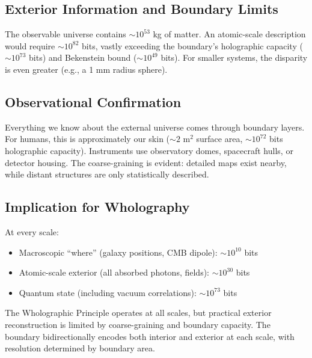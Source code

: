 ﻿\documentclass[12pt]{article}
\begin{document}
\subsection*{Exterior Information and Boundary Limits}
The observable universe contains $\sim 10^{53}$ kg of matter. An atomic-scale description would require $\sim 10^{82}$ bits, vastly exceeding the boundary's holographic capacity ($\sim 10^{73}$ bits) and Bekenstein bound ($\sim 10^{49}$ bits). For smaller systems, the disparity is even greater (e.g., a 1 mm radius sphere).


\subsection*{Observational Confirmation}
Everything we know about the external universe comes through boundary layers. For humans, this is approximately our skin ($\sim 2 \text{ m}^2$ surface area, $\sim 10^{72}$ bits holographic capacity). Instruments use observatory domes, spacecraft hulls, or detector housing. The coarse-graining is evident: detailed maps exist nearby, while distant structures are only statistically described.


\subsection*{Implication for Wholography}
At every scale:
\begin{itemize}
    \item Macroscopic ``where'' (galaxy positions, CMB dipole): $\sim 10^{10}$ bits
    \item Atomic-scale exterior (all absorbed photons, fields): $\sim 10^{30}$ bits
    \item Quantum state (including vacuum correlations): $\sim 10^{73}$ bits
\end{itemize}
The Wholographic Principle operates at all scales, but practical exterior reconstruction is limited by coarse-graining and boundary capacity. The boundary bidirectionally encodes both interior and exterior at each scale, with resolution determined by boundary area.
\end{document}
